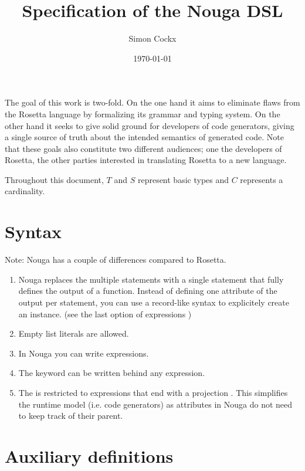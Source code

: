 \documentclass[english,11pt,a4paper]{article}
\title{Specification of the Nouga DSL}
\author{Simon Cockx}
\date{\today}
\begin{document}
\maketitle


\url{} %



The goal of this work is two-fold. On the one hand it aims to eliminate flaws from the Rosetta language by formalizing its grammar and typing system. On the other hand it seeks to give solid ground for developers of code generators, giving a single source of truth about the intended semantics of generated code. Note that these goals also constitute two different audiences; one the developers of Rosetta, the other parties interested in translating Rosetta to a new language.

Throughout this document, $T$ and $S$ represent basic types and $C$ represents a cardinality.

\section{Syntax}



Note: Nouga has a couple of differences compared to Rosetta.
\begin{enumerate}
\item Nouga replaces the multiple  statements with a single statement that fully defines the output of a function. Instead of defining one attribute of the output per  statement, you can use a record-like syntax to explicitely create an instance. (see the last option of expressions )
\item Empty list literals are allowed.
\item In Nouga you can write  expressions.
\item The  keyword can be written behind any expression.
\item The   is restricted to expressions that end with a projection \lit{->} . This simplifies the runtime model (i.e. code generators) as attributes in Nouga do not need to keep track of their parent.
\end{enumerate}


\section{Auxiliary definitions}
\end{document}
